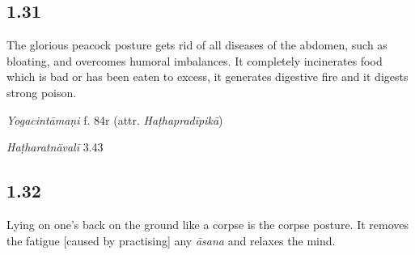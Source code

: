 \begin{ekdosis}
\subsection*{1.31}
\begin{translation}[hp01_031]
The glorious peacock posture gets rid of all diseases of the abdomen, such as bloating, and overcomes humoral imbalances. It completely incinerates food which is bad or has been eaten to excess, it generates digestive fire and it digests strong poison.
\end{translation}

\begin{testimonia}[hp01_031]
\emph{Yogacintāmaṇi} f. 84r (attr. \emph{Haṭhapradīpikā})

\begin{versinnote}
\end{versinnote}

\emph{Haṭharatnāvalī} 3.43

\begin{versinnote}
\end{versinnote}

\end{testimonia}


\subsection*{1.32}
\begin{translation}[hp01_032]
Lying on one's back on the ground like a corpse is the corpse posture. It removes the fatigue [caused by practising] any \emph{āsana} and relaxes the mind.
\end{translation}


\end{ekdosis}
